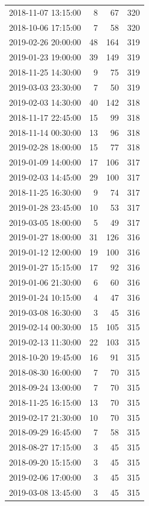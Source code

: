 \begin{tabular}{lrrr}
2018-11-07 13:15:00 & 8 & 67 & 320 \\
2018-10-06 17:15:00 & 7 & 58 & 320 \\
2019-02-26 20:00:00 & 48 & 164 & 319 \\
2019-01-23 19:00:00 & 39 & 149 & 319 \\
2018-11-25 14:30:00 & 9 & 75 & 319 \\
2019-03-03 23:30:00 & 7 & 50 & 319 \\
2019-02-03 14:30:00 & 40 & 142 & 318 \\
2018-11-17 22:45:00 & 15 & 99 & 318 \\
2018-11-14 00:30:00 & 13 & 96 & 318 \\
2019-02-28 18:00:00 & 15 & 77 & 318 \\
2019-01-09 14:00:00 & 17 & 106 & 317 \\
2019-02-03 14:45:00 & 29 & 100 & 317 \\
2018-11-25 16:30:00 & 9 & 74 & 317 \\
2019-01-28 23:45:00 & 10 & 53 & 317 \\
2019-03-05 18:00:00 & 5 & 49 & 317 \\
2019-01-27 18:00:00 & 31 & 126 & 316 \\
2019-01-12 12:00:00 & 19 & 100 & 316 \\
2019-01-27 15:15:00 & 17 & 92 & 316 \\
2019-01-06 21:30:00 & 6 & 60 & 316 \\
2019-01-24 10:15:00 & 4 & 47 & 316 \\
2019-03-08 16:30:00 & 3 & 45 & 316 \\
2019-02-14 00:30:00 & 15 & 105 & 315 \\
2019-02-13 11:30:00 & 22 & 103 & 315 \\
2018-10-20 19:45:00 & 16 & 91 & 315 \\
2018-08-30 16:00:00 & 7 & 70 & 315 \\
2018-09-24 13:00:00 & 7 & 70 & 315 \\
2018-11-25 16:15:00 & 13 & 70 & 315 \\
2019-02-17 21:30:00 & 10 & 70 & 315 \\
2018-09-29 16:45:00 & 7 & 58 & 315 \\
2018-08-27 17:15:00 & 3 & 45 & 315 \\
2018-09-20 15:15:00 & 3 & 45 & 315 \\
2019-02-06 17:00:00 & 3 & 45 & 315 \\
2019-03-08 13:45:00 & 3 & 45 & 315 \\

\end{tabular}
